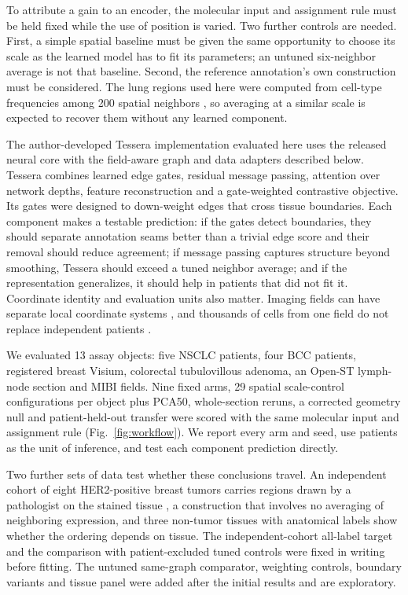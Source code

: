 To attribute a gain to an encoder, the molecular input and assignment rule must be held fixed while the use of position is varied. Two further controls are needed. First, a simple spatial baseline must be given the same opportunity to choose its scale as the learned model has to fit its parameters; an untuned six-neighbor average is not that baseline. Second, the reference annotation's own construction must be considered. The lung regions used here were computed from cell-type frequencies among 200 spatial neighbors \citep{he2022cosmx,sun2026consensus}, so averaging at a similar scale is expected to recover them without any learned component.

The author-developed Tessera implementation evaluated here uses the released neural core with the field-aware graph and data adapters described below. Tessera combines learned edge gates, residual message passing, attention over network depths, feature reconstruction and a gate-weighted contrastive objective. Its gates were designed to down-weight edges that cross tissue boundaries. Each component makes a testable prediction: if the gates detect boundaries, they should separate annotation seams better than a trivial edge score and their removal should reduce agreement; if message passing captures structure beyond smoothing, Tessera should exceed a tuned neighbor average; and if the representation generalizes, it should help in patients that did not fit it. Coordinate identity and evaluation units also matter. Imaging fields can have separate local coordinate systems \citep{palla2022squidpy,yan2026alignment}, and thousands of cells from one field do not replace independent patients \citep{zimmerman2021pseudoreplication,roberts2017crossvalidation}.

We evaluated 13 assay objects: five NSCLC patients, four BCC patients, registered breast Visium, colorectal tubulovillous adenoma, an Open-ST lymph-node section and MIBI fields. Nine fixed arms, 29 spatial scale-control configurations per object plus PCA50, whole-section reruns, a corrected geometry null and patient-held-out transfer were scored with the same molecular input and assignment rule (Fig.~\ref{fig:workflow}). We report every arm and seed, use patients as the unit of inference, and test each component prediction directly.

Two further sets of data test whether these conclusions travel. An independent cohort of eight HER2-positive breast tumors carries regions drawn by a pathologist on the stained tissue \citep{andersson2021her2st}, a construction that involves no averaging of neighboring expression, and three non-tumor tissues with anatomical labels \citep{maynard2021dlpfc,wang2018starmap,moffitt2018merfish} show whether the ordering depends on tissue. The independent-cohort all-label target and the comparison with patient-excluded tuned controls were fixed in writing before fitting. The untuned same-graph comparator, weighting controls, boundary variants and tissue panel were added after the initial results and are exploratory.



